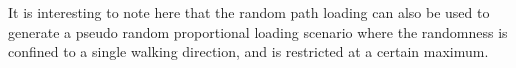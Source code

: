 

It is interesting to note here that the random path loading can also be used to generate a pseudo random proportional loading scenario where the randomness is confined to a single walking direction, and is restricted at a certain maximum.


